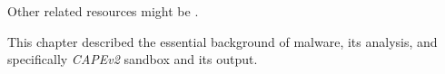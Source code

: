 Other related resources might be \cite{Singh2020, Sethi2019, Abdessadki2019, Gibert2020}.

\hfill \break

This chapter described the essential background of malware, its analysis, and specifically \emph{CAPEv2} sandbox and its output. 











